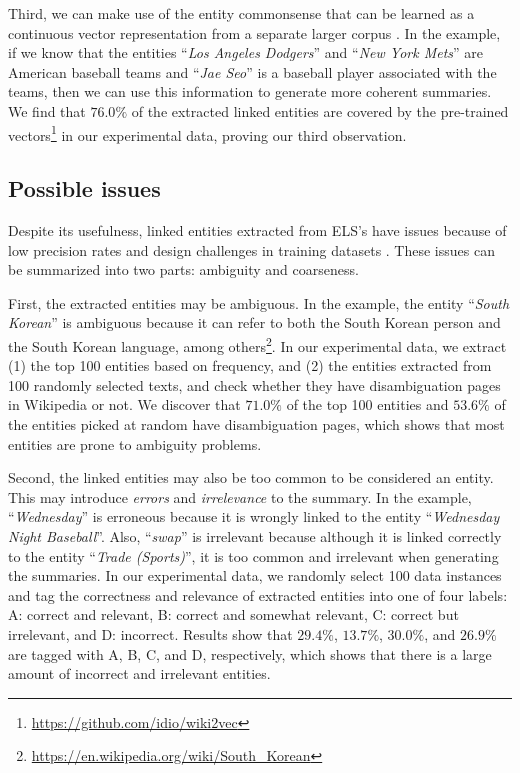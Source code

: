 \documentclass[11pt,a4paper]{article}
\begin{document}
Third, we can make use of the entity commonsense that can be learned as a continuous vector representation from a separate larger corpus \cite{ni2016semantic,yamada2017learning}. In the example, if we know that the entities ``\textit{Los Angeles Dodgers}'' and ``\textit{New York Mets}'' are American baseball teams and ``\textit{Jae Seo}'' is a baseball player associated with the teams, then we can use this information to generate more coherent summaries. 
We find that $76.0\%$ of the extracted linked entities are covered by the pre-trained vectors\footnote{\url{https://github.com/idio/wiki2vec}} in our experimental data, proving our third observation.

\subsection{Possible issues}
\label{sec:issues}

Despite its usefulness, linked entities extracted from ELS's 
have issues because of low precision rates
\cite{hasibi2016reproducibility} and design challenges in training datasets \cite{ling2015design}. These issues can be summarized into two parts: ambiguity and coarseness.


First, the extracted entities may be ambiguous. In the example, the entity ``\textit{South Korean}'' is ambiguous because it can refer to both the South Korean person and the South Korean language, among others\footnote{\url{https://en.wikipedia.org/wiki/South_Korean}}.
In our experimental data, we extract (1) the top 100 entities based on frequency, and (2) the entities extracted from 100 randomly selected texts, and check whether they have disambiguation pages in Wikipedia or not. We discover that $71.0\%$ of the top 100 entities and $53.6\%$ of the entities picked at random have disambiguation pages, which shows that most entities are prone to ambiguity problems.

Second, the linked entities may also be too common to be considered an entity.
This may introduce \textit{errors} and \textit{irrelevance} to the summary.
In the example, ``\textit{Wednesday}'' is erroneous because it is wrongly linked to the entity ``\textit{Wednesday Night Baseball}''. Also, ``\textit{swap}'' is irrelevant because although it is linked correctly to the entity ``\textit{Trade (Sports)}'', it is too common and irrelevant when generating the summaries. In our experimental data, we randomly select 100 data instances and tag the correctness and relevance of extracted entities into one of four labels: A: correct and relevant, B: correct and somewhat relevant, C: correct but irrelevant, and D: incorrect. Results show that $29.4\%$, $13.7\%$, $30.0\%$, and $26.9\%$ are tagged with A, B, C, and D, respectively, which shows that there is a large amount of incorrect and irrelevant entities.
\end{document}
